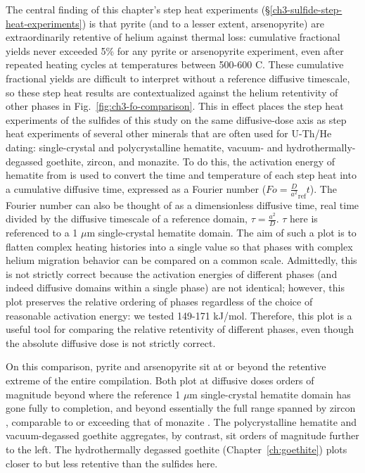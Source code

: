The central finding of this chapter's step heat experiments
(\S\ref{ch3-sulfide-step-heat-experiments}) is that pyrite (and to a lesser extent, arsenopyrite) are extraordinarily retentive of
helium against thermal loss: cumulative fractional yields never exceeded 5\% for any pyrite or
arsenopyrite experiment, even after repeated heating cycles at temperatures between 500-600 \textdegree C. These cumulative fractional yields are difficult to interpret without a reference 
diffusive timescale, so these step heat results are contextualized against the helium retentivity of 
other phases in Fig.~\ref{fig:ch3-fo-comparison}. This in effect places the step heat experiments of
the sulfides of this study on the same diffusive-dose axis as
step heat experiments of several other minerals that are often used for U-Th/He dating: single-crystal and polycrystalline hematite, vacuum- and
hydrothermally-degassed goethite, zircon, and monazite. To do this, the activation energy of hematite 
from \citet{farley2018} is used to convert the time and temperature of each step heat into a cumulative diffusive time, expressed as a Fourier number ($Fo = \frac{D}{a^2}_{\mathrm{ref}}t$). 
The Fourier number can also be thought of as a dimensionless diffusive time, real time divided by the diffusive timescale of a reference domain, $\tau = \frac{a^2}{D}$. $\tau$ here is
referenced to a 1 $\mu$m single-crystal hematite domain. The aim of such a plot is to flatten complex heating histories into a single value so that 
phases with complex helium migration behavior can be compared on a common scale. Admittedly, this is not
strictly correct because the activation energies of different phases (and indeed diffusive domains within a single phase) are not identical; however, this plot preserves the relative ordering of phases
regardless of the choice of reasonable activation energy: we tested 149-171 kJ/mol. Therefore, this plot is a useful tool for comparing the relative retentivity of different phases, 
even though the absolute diffusive dose is not strictly correct.

On this comparison, pyrite and arsenopyrite sit at or beyond the
retentive extreme of the entire compilation. Both plot at diffusive doses
orders of magnitude beyond where the reference 1 $\mu$m single-crystal
hematite domain \citep{farley2018} has gone fully to completion, and
beyond essentially the full range spanned by zircon
\citep{guenthner2013}, comparable to or exceeding that of
monazite \citep{farley2007}. The polycrystalline
hematite and vacuum-degassed goethite aggregates, by contrast, sit
orders of magnitude further to the left. The hydrothermally degassed
goethite (Chapter~\ref{ch:goethite}) plots closer to but less
retentive than the sulfides here.

